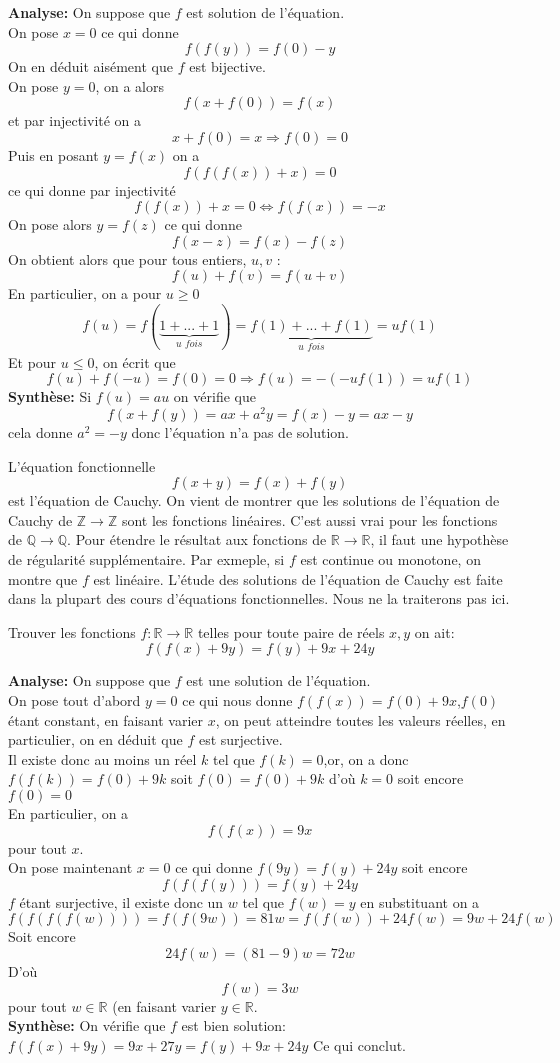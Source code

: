 \begin{preuve}
\textbf{Analyse:} On suppose que $f$ est solution de l'équation.
\\
On pose $x=0$ ce qui donne 
$$f(f(y))=f(0)-y $$
On en déduit aisément que $f$ est bijective.
\\
On pose $y=0$, on a alors
$$f(x+f(0))=f(x) $$
et par injectivité on a 
$$x+f(0)=x\Rightarrow f(0)=0 $$
Puis en posant $y=f(x)$ on a
$$f(f(f(x))+x)=0 $$ ce qui donne par injectivité
$$f(f(x))+x=0\iff f(f(x))=-x $$
On pose alors $y=f(z)$ ce qui donne 
$$f(x-z)=f(x)-f(z) $$
On obtient alors que pour tous entiers, $u,v$ :
$$f(u)+f(v)=f(u+v) $$
En particulier, on a pour $u\geq 0$
$$f(u)=f(\underbrace{1+...+1}_{u \textit{ fois}})=\underbrace{f(1)+...+f(1)}_{u \textit{ fois}} =uf(1)$$
Et pour $u\leq 0$, on écrit que 
$$f(u)+f(-u)=f(0)=0\Rightarrow f(u)=-(-uf(1))=uf(1) $$
\textbf{Synthèse:} Si $f(u)=au$ on vérifie que 
$$ f(x+f(y))=ax+a^2y=f(x)-y=ax-y$$ cela donne $a^2=-y$ donc l'équation n'a pas de solution.
\end{preuve}
\begin{rem}
L'équation fonctionnelle
$$f(x+y)=f(x)+f(y) $$
est l'équation de Cauchy. On vient de montrer que les solutions de l'équation de Cauchy de $\mathbb{Z}\to \mathbb{Z}$ sont les fonctions linéaires. C'est aussi vrai pour les fonctions de $\mathbb{Q}\to \mathbb{Q}$. Pour étendre le résultat aux fonctions de $\mathbb{R} \to \mathbb{R}$, il faut une hypothèse de régularité supplémentaire. Par exmeple, si $f$ est continue ou monotone, on montre que $f$ est linéaire. L'étude des solutions de l'équation de Cauchy est faite dans la plupart des cours d'équations fonctionnelles. Nous ne la traiterons pas ici.
\end{rem}
\begin{exo}[M]
Trouver les fonctions $f:\mathbb{R}\to \mathbb{R}$ telles pour toute paire de réels $x,y$ on ait:
$$f(f(x)+9y)=f(y)+9x+24y  $$
\end{exo}
\begin{preuve}
\textbf{Analyse:} On suppose que $f$ est une solution de l'équation.
\\
On pose tout d'abord $y=0$ ce qui nous donne $f(f(x))=f(0)+9x$,$f(0)$ étant constant, en faisant varier $x$, on peut atteindre toutes les valeurs réelles, en particulier, on en déduit que $f$ est surjective.
\\

Il existe donc au moins un réel $k$ tel que $f(k)=0$,or, on a donc $f(f(k))=f(0)+9k$ soit $f(0)=f(0)+9k$ d'où $k=0$ soit encore $f(0)=0$
\\
En particulier, on a $$f(f(x))=9x$$ pour tout $x$.
\\
On pose maintenant $x=0$ ce qui donne $f(9y)=f(y)+24y$ soit encore $$f(f(f(y)))=f(y)+24y$$ $f$ étant surjective, il existe donc un $w$ tel que $f(w)=y$ en substituant on a $$f(f(f(f(w))))=f(f(9w))=81w=f(f(w))+24f(w)=9w+24f(w)$$
Soit encore $$24f(w)=(81-9)w=72w$$
D'où $$f(w)=3w$$ pour tout $w\in \mathbb{R}$ (en faisant varier $y\in \mathbb{R}$.
\\
\textbf{Synthèse:}
On vérifie que $f$ est bien solution:
$f(f(x)+9y)=9x+27y=f(y)+9x+24y$
Ce qui conclut. 
\end{preuve}
